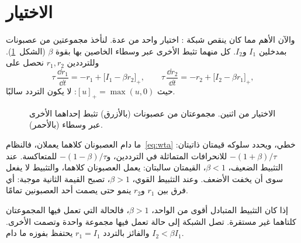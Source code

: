 \section{الاختيار}

والآن الأهم مما كان ينقص شبكة : اختيار واحد من عدة. لنأخذ مجموعتين من عصبونات  بمدخلين $I_1$ و$I_2$. كل منهما تثبط الأخرى عبر وسطاء  الخاصين بها بقوة $\beta$ (الشكل~\ref{fig:wta}). وللترددين $r_1,r_2$ نحصل على
\begin{equation}
\tau\,\frac{\dd r_1}{\dd t} = -r_1 + \bigl[I_1-\beta r_2\bigr]_+ ,\qquad
\tau\,\frac{\dd r_2}{\dd t} = -r_2 + \bigl[I_2-\beta r_1\bigr]_+ ,
\label{eq:wta}
\end{equation}
حيث $[u]_+=\max(u,0)$: لا يكون التردد سالبًا.

\begin{figure}[t]
\centering
{}
\caption{الاختيار من اثنين. مجموعتان من عصبونات  (بالأزرق) تثبط إحداهما الأخرى عبر وسطاء  (بالأحمر).}
\label{fig:wta}
\end{figure}

ما دام العصبونان كلاهما يعملان، فالنظام~\eqref{eq:wta} خطي، ويحدد سلوكه قيمتان ذاتيتان: $-(1+\beta)/\tau$ للانحرافات المتماثلة في الترددين، و$-(1-\beta)/\tau$ للمتعاكسة. عند التثبيط الضعيف، $\beta<1$، القيمتان سالبتان: يعمل العصبونان كلاهما، والتثبيط لا يفعل سوى أن يخفت الأضعف. وعند التثبيط القوي، $\beta>1$، تصبح القيمة الثانية موجبة: أي فرق بين $r_1$ و$r_2$ ينمو حتى يصمت أحد العصبونين تمامًا.

\begin{keyblock}
\begin{proposition}
\label{prop:wta}
إذا كان التثبيط المتبادل أقوى من الواحد، $\beta>1$، فالحالة التي تعمل فيها المجموعتان كلتاهما غير مستقرة. تصل الشبكة إلى حالة تعمل فيها مجموعة واحدة وتصمت الأخرى. والفائز بالتردد $r_1=I_1$ يحتفظ بفوزه ما دام $I_2<\beta I_1$.
\end{proposition}
\end{keyblock}

